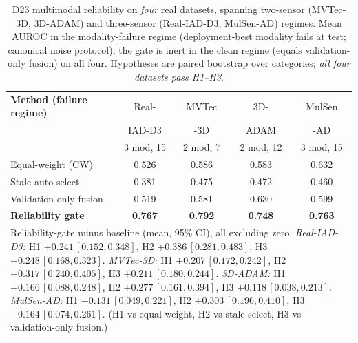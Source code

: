 \documentclass[10pt,conference]{IEEEtran}
\begin{document}
\begin{table}[t]\centering
\caption{D23 multimodal reliability on \emph{four} real datasets, spanning two-sensor
(MVTec-3D, 3D-ADAM) and three-sensor (Real-IAD-D3, MulSen-AD) regimes. Mean AUROC in
the modality-failure regime (deployment-best modality fails at test; canonical noise
protocol); the gate is inert in the clean regime (equals validation-only fusion) on all
four. Hypotheses are paired bootstrap over categories; \emph{all four datasets pass
H1--H3}.}
\label{tab:d23}\footnotesize
\begin{tabular}{lcccc}
\toprule
\textbf{Method (failure regime)} & \scriptsize Real- & \scriptsize MVTec & \scriptsize 3D- & \scriptsize MulSen \\
 & \scriptsize IAD-D3 & \scriptsize -3D & \scriptsize ADAM & \scriptsize -AD \\
 & \scriptsize 3 mod, 15 & \scriptsize 2 mod, 7 & \scriptsize 2 mod, 12 & \scriptsize 3 mod, 15 \\
\midrule
Equal-weight (CW) & 0.526 & 0.586 & 0.583 & 0.632 \\
Stale auto-select & 0.381 & 0.475 & 0.472 & 0.460 \\
Validation-only fusion & 0.519 & 0.581 & 0.630 & 0.599 \\
\textbf{Reliability gate} & \textbf{0.767} & \textbf{0.792} & \textbf{0.748} & \textbf{0.763} \\
\midrule
\multicolumn{5}{p{0.95\linewidth}}{\footnotesize Reliability-gate minus baseline (mean, 95\% CI), all excluding zero. \emph{Real-IAD-D3:} H1 $+0.241\,[0.152,0.348]$, H2 $+0.386\,[0.281,0.483]$, H3 $+0.248\,[0.168,0.323]$. \emph{MVTec-3D:} H1 $+0.207\,[0.172,0.242]$, H2 $+0.317\,[0.240,0.405]$, H3 $+0.211\,[0.180,0.244]$. \emph{3D-ADAM:} H1 $+0.166\,[0.088,0.248]$, H2 $+0.277\,[0.161,0.394]$, H3 $+0.118\,[0.038,0.213]$. \emph{MulSen-AD:} H1 $+0.131\,[0.049,0.221]$, H2 $+0.303\,[0.196,0.410]$, H3 $+0.164\,[0.074,0.261]$. (H1 vs equal-weight, H2 vs stale-select, H3 vs validation-only fusion.)}\\
\bottomrule
\end{tabular}
\end{table}
\end{document}
